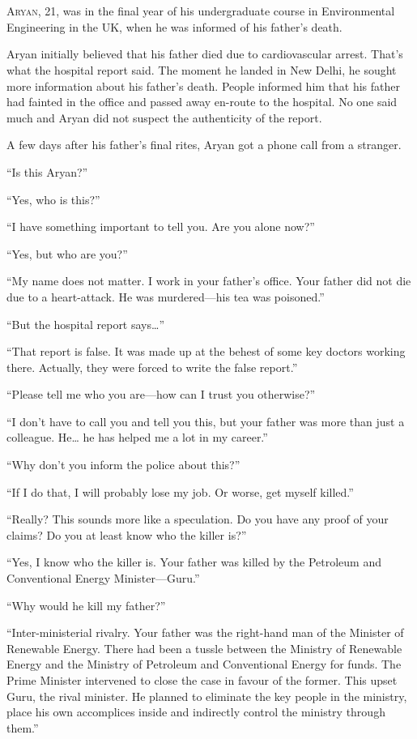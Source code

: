 \chapter{}

\lettrine{A}{ryan}, 21, was in the final year of his undergraduate course
in Environmental Engineering in the UK, when he was informed of his father's
death.

Aryan initially believed that his father died due to cardiovascular arrest.
That's what the hospital report said. The moment he landed in New Delhi, he
sought more information about his father's death. People informed him that his
father had fainted in the office and passed away en-route to the hospital. No
one said much and Aryan did not suspect the authenticity of the report.

A few days after his father's final rites, Aryan got a phone call from a stranger.

“Is this Aryan?”

“Yes, who is this?”

“I have something important to tell you. Are you alone now?”

“Yes, but who are you?”

“My name does not matter. I work in your father's office. Your father did not
die due to a heart-attack. He was murdered—his tea was poisoned.”

“But the hospital report says…”

“That report is false. It was made up at the behest of some key doctors working
there. Actually, they were forced to write the false report.”

“Please tell me who you are—how can I trust you otherwise?”

“I don't have to call you and tell you this, but your father was more than just
a colleague. He… he has helped me a lot in my career.”

“Why don't you inform the police about this?”

“If I do that, I will probably lose my job. Or worse, get myself killed.”

“Really? This sounds more like a speculation. Do you have any proof of your
claims? Do you at least know who the killer is?”

“Yes, I know who the killer is. Your father was killed by the Petroleum and
Conventional Energy Minister—Guru.”

“Why would he kill my father?”

“Inter-ministerial rivalry. Your father was the right-hand man of the Minister
of Renewable Energy. There had been a tussle between the Ministry of Renewable Energy
and the Ministry of Petroleum and Conventional Energy for funds. The Prime Minister
intervened to close the case in favour of the former. This
upset Guru, the rival minister. He planned to eliminate the key people in the
ministry, place his own accomplices inside and indirectly
control the ministry through them.”

